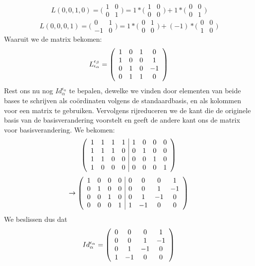 \documentclass[lineaire_algebra_oplossingen.tex]{subfiles}
\begin{document}
\[L(0,0,1,0)=\bigl(\begin{smallmatrix} 1&0\\ 0&1 \end{smallmatrix} \bigr) = 1*\bigl(\begin{smallmatrix} 1&0\\ 0&0 \end{smallmatrix} \bigr) + 1*\bigl(\begin{smallmatrix} 0&0\\ 0&1 \end{smallmatrix} \bigr)\]
\[L(0,0,0,1)=\bigl(\begin{smallmatrix} 0&1\\ -1&0 \end{smallmatrix} \bigr) = 1*\bigl(\begin{smallmatrix} 0&1\\ 0&0 \end{smallmatrix} \bigr) + (-1)*\bigl(\begin{smallmatrix} 0&0\\ 1&0 \end{smallmatrix} \bigr)\]
Waaruit we de matrix bekomen:
\[L^{\epsilon_\beta}_{\epsilon_\alpha} = 
\left(\begin{array}{c c c c}
1 & 0 & 1 & 0 \\ 
1 & 0 & 0 & 1 \\ 
0 & 1 & 0 & -1 \\ 
0 & 1 & 1 & 0 \\ 
\end{array}
\right)
\]
Rest ons nu nog $Id^{\epsilon_\alpha}_{\alpha}$ te bepalen, dewelke we vinden door elementen van beide bases te schrijven als co\"ordinaten volgens de standaardbasis, en als kolommen voor een matrix te gebruiken. Vervolgens rijreduceren we de kant die de originele basis van de basisverandering voorstelt en geeft de andere kant ons de matrix voor basisverandering. We bekomen:
\[
\left(
\begin{array}{c c c c | c c c c}
1 & 1 & 1 & 1 & 1 & 0 & 0 & 0 \\ 
1 & 1 & 1 & 0 & 0 & 1 & 0 & 0 \\ 
1 & 1 & 0 & 0 & 0 & 0 & 1 & 0 \\ 
1 & 0 & 0 & 0 & 0 & 0 & 0 & 1 \\ 
\end{array}
\right)
\]
\[
\rightarrow
\left(
\begin{array}{c c c c | c c c c}
1 & 0 & 0 & 0 & 0 & 0 & 0 & 1 \\ 
0 & 1 & 0 & 0 & 0 & 0 & 1 & -1 \\ 
0 & 0 & 1 & 0 & 0 & 1 & -1 & 0 \\ 
0 & 0 & 0 & 1 & 1 & -1 & 0 & 0 \\
\end{array}
\right)
\]
We beslissen dus dat
\[Id^{\epsilon_\alpha}_{\alpha} = \left(
\begin{array}{c c c c}
0 & 0 & 0 & 1 \\ 
0 & 0 & 1 & -1 \\ 
0 & 1 & -1 & 0 \\ 
1 & -1 & 0 & 0 \\
\end{array}
\right)
\]
\end{document}

